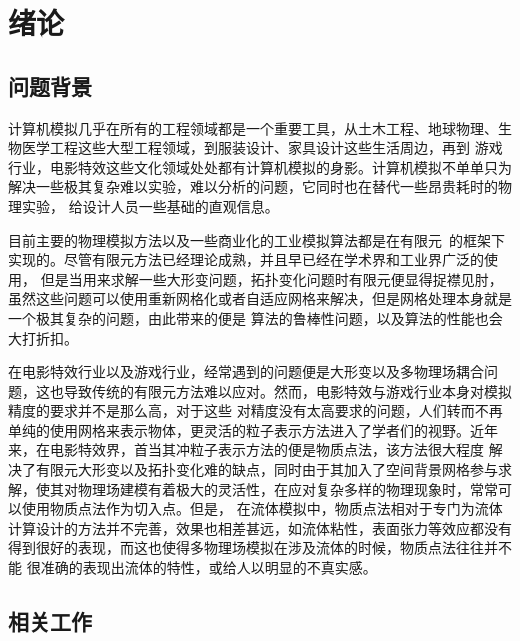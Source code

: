 
\chapter{绪论}
\label{chap_int}
\section{问题背景}
计算机模拟几乎在所有的工程领域都是一个重要工具，从土木工程、地球物理、生物医学工程这些大型工程领域，到服装设计、家具设计这些生活周边，再到
游戏行业，电影特效这些文化领域处处都有计算机模拟的身影。计算机模拟不单单只为解决一些极其复杂难以实验，难以分析的问题，它同时也在替代一些昂贵耗时的物理实验，
给设计人员一些基础的直观信息。

目前主要的物理模拟方法以及一些商业化的工业模拟算法都是在有限元~\cite{1942Variational}的框架下实现的。尽管有限元方法已经理论成熟，并且早已经在学术界和工业界广泛的使用，
但是当用来求解一些大形变问题，拓扑变化问题时有限元便显得捉襟见肘，虽然这些问题可以使用重新网格化或者自适应网格来解决，但是网格处理本身就是一个极其复杂的问题，由此带来的便是
算法的鲁棒性问题，以及算法的性能也会大打折扣。

在电影特效行业以及游戏行业，经常遇到的问题便是大形变以及多物理场耦合问题，这也导致传统的有限元方法难以应对。然而，电影特效与游戏行业本身对模拟精度的要求并不是那么高，对于这些
对精度没有太高要求的问题，人们转而不再单纯的使用网格来表示物体，更灵活的粒子表示方法进入了学者们的视野。近年来，在电影特效界，首当其冲粒子表示方法的便是物质点法，该方法很大程度
解决了有限元大形变以及拓扑变化难的缺点，同时由于其加入了空间背景网格参与求解，使其对物理场建模有着极大的灵活性，在应对复杂多样的物理现象时，常常可以使用物质点法作为切入点。但是，
在流体模拟中，物质点法相对于专门为流体计算设计的方法并不完善，效果也相差甚远，如流体粘性，表面张力等效应都没有得到很好的表现，而这也使得多物理场模拟在涉及流体的时候，物质点法往往并不能
很准确的表现出流体的特性，或给人以明显的不真实感。
\section{相关工作}
